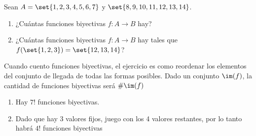 \ejercicio
Sean $A = \set{1,2,3,4,5,6,7}$ y $\set{8,9,10,11,12,13,14}$.
\begin{enumerate}[label=\roman*)]
	\item ¿Cuántas funciones biyectivas $f: A \to B$ hay?
	\item ¿Cuántas funciones biyectivas $f: A \to B$ hay tales que $f(\set{1,2,3}) = \set{12,13,14}$?
\end{enumerate}

\separadorCorto

Cuando cuento funciones biyectivas, el ejercicio es como reordenar los elementos del conjunto de llegada de todas las
formas posibles. Dado un conjunto $\im(f)$, la cantidad de funciones biyectivas será $\#\im(f)$

\begin{enumerate}[label=\roman*)]
	\item Hay $7!$ funciones biyectivas.
	\item Dado que hay 3 valores fijos, juego con los 4 valores restantes, por lo tanto habrá $4!$ funciones biyectivas
\end{enumerate}
